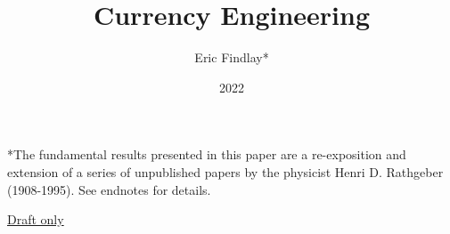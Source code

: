 \documentclass[a4paper]{article}
\begin{document}
    \title{Currency Engineering}
    \author{Eric Findlay*}
    \date{2022}
    \maketitle

    *The fundamental results presented in this paper are a re-exposition and extension of a series
    of unpublished papers by the physicist Henri D. Rathgeber (1908-1995). See endnotes for details.

    \underline{Draft only}

    \tableofcontents
    \newpage

    
    
    
    
    
    
    
    
    
    
    
    
    
\end{document}
